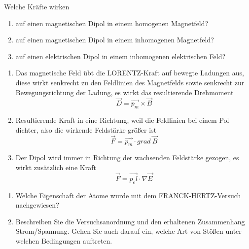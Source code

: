 \documentclass[12pt,a4paper,ngerman]{article}
\begin{document}
\begin{framed}
Welche Kräfte wirken
\begin{enumerate}
\item auf einen magnetischen Dipol in einem homogenen Magnetfeld?
\item auf einen magnetischen Dipol in einem inhomogenen Magnetfeld?
\item auf einen elektrischen Dipol in einem inhomogenen elektrischen Feld?
\end{enumerate}
\end{framed}

\begin{enumerate}
\item Das magnetische Feld übt die LORENTZ-Kraft auf bewegte Ladungen aus, diese wirkt senkrecht zu den Feldlinien des Magnetfelds sowie senkrecht zur Bewegungsrichtung der Ladung, es wirkt das resultierende Drehmoment
\begin{equation*}
\vec{D} = \vec{p_m}\times \vec{B}
\end{equation*}
\item Resultierende Kraft in eine Richtung, weil die Feldlinien bei einem Pol dichter, also die wirkende Feldstärke größer ist
\begin{equation*}
\vec{F} = \vec{p_m} \cdot grad \ \vec{B}
\end{equation*}
\item Der Dipol wird immer in Richtung der wachsenden Feldstärke gezogen, es wirkt zusätzlich eine Kraft
\begin{equation*}
\vec{F} = \vec{p_el} \cdot \nabla \vec{E}
\end{equation*}
\end{enumerate}

\pagebreak


\begin{framed}
\begin{enumerate}
\item Welche Eigenschaft der Atome wurde mit dem FRANCK-HERTZ-Versuch nachgewiesen?
\item Beschreiben Sie die Versuchsanordnung und den erhaltenen Zusammenhang Strom/Spannung. Gehen Sie auch darauf ein, welche Art von Stößen unter welchen Bedingungen auftreten.
\end{enumerate}
\end{framed}
\end{document}
